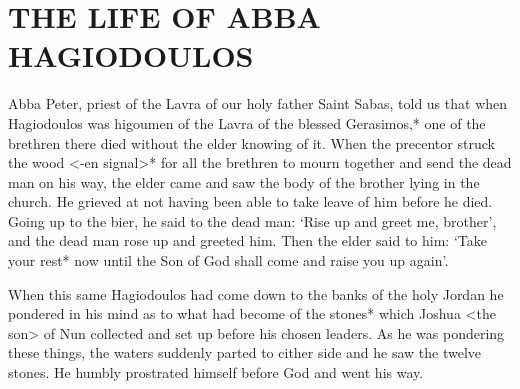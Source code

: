 \chapter{THE LIFE OF ABBA HAGIODOULOS}

Abba Peter, priest of the Lavra of our holy father Saint Sabas, told us that when Hagiodoulos was higoumen of the Lavra of the blessed Gerasimos,* one of the brethren there died without the elder
knowing of it.
When the precentor struck the wood <-en signal>* for all the brethren to mourn together and send the dead man on his way, the elder came and saw the body of the brother lying in the church.
He grieved at not having been able to take leave of him before he died.
Going up to the bier, he said to the dead man: `Rise up and greet me, brother', and the dead man rose up and greeted him.
Then the elder said to him: `Take your rest* now until the Son of God shall come and raise you up again'.

When this same Hagiodoulos had come down to the banks of the holy Jordan he pondered in his mind as to what had become of the stones* which Joshua <the son> of Nun collected and set up before his chosen leaders.
As he was pondering these things, the waters suddenly parted to cither side and he saw the twelve stones.
He humbly prostrated himself before God and went his way.

